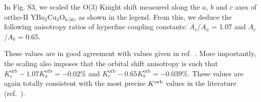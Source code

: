 \documentclass[superscriptaddress,twocolumn,prl,preprintnumbers,amsmath,amssymb]{revtex4}
\begin{document}
In Fig. S3, we scaled the O(3) Knight shift measured along the $a$, $b$ and $c$ axes of ortho-II YBa$_2$Cu$_3$O$_{6.56}$, as shown in the legend. From this, we deduce the following anisotropy ratios of hyperfine coupling constants: $A_c$/$A_a$ = 1.07 and $A_c$/$A_b$ = 0.65.

These values are in good agreement with values given in ref.~\cite{Yoshinari90}. 
More importantly, the scaling also imposes that the orbital shift anisotropy is such that $K_{c}^{\text{orb}}-1.07K_{a}^{\text{orb}}=-0.02\%$ and $K_{c}^{\text{orb}}-0.65K_{b}^{\text{orb}}=-0.039\%$. These values are again totally consistent with the most precise $K^{\rm orb}$ values in the literature (ref.~\cite{Takigawa89}).
\end{document}
